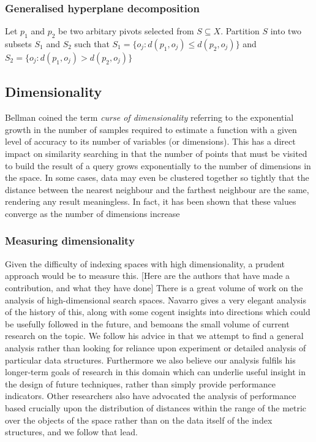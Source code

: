 \subsubsection{Generalised hyperplane decomposition}
%
\begin{mydef}
Let $p_1$ and $p_2$ be two arbitary pivots selected from $S \subseteq X$.  Partition $S$ into two subsets $S_1$ and $S_2$ such that $S_1 = \{o_j : d(p_1, o_j) \leq d(p_2, o_j)\}$ and $S_2 = \{o_j : d(p_1, o_j) > d(p_2, o_j)\}$
\end{mydef}
\subsection{Dimensionality}
Bellman coined the term \textit{curse of dimensionality} referring to the exponential growth in the number of samples required to estimate a function with a given level of accuracy to its number of variables (or dimensions)\cite{Bellman:2003}.  This has a direct impact on similarity searching in that the number of points that must be visited to build the result of a query grows exponentially to the number of dimensions in the space.  In some cases, data may even be clustered together so tightly that the distance between the nearest neighbour and the farthest neighbour are the same, rendering any result meaningless.  In fact, it has been shown that these values converge as the number of dimensions increase%
%
\subsubsection{Measuring dimensionality}
Given the difficulty of indexing spaces with high dimensionality, a prudent approach would be to measure this.  [Here are the authors that have made a contribution, and what they have done]
%
There is a great volume of work on the analysis of high-dimensional search spaces. Navarro gives a very elegant analysis of the history of this, along with some cogent insights into directions which could be usefully followed in the future, and bemoans the small volume of current research on the topic. We follow his advice in that we attempt to find a general analysis rather than looking for reliance upon experiment or detailed analysis of particular data structures. Furthermore we also believe our analysis fulfils his longer-term goals of research in this domain which can underlie useful insight in the design of future techniques, rather than simply provide performance indicators.
Other researchers also have advocated the analysis of performance based crucially upon the distribution of distances within the range of the metric over the objects of the space rather than on the data itself of the index structures, and we follow that lead.

